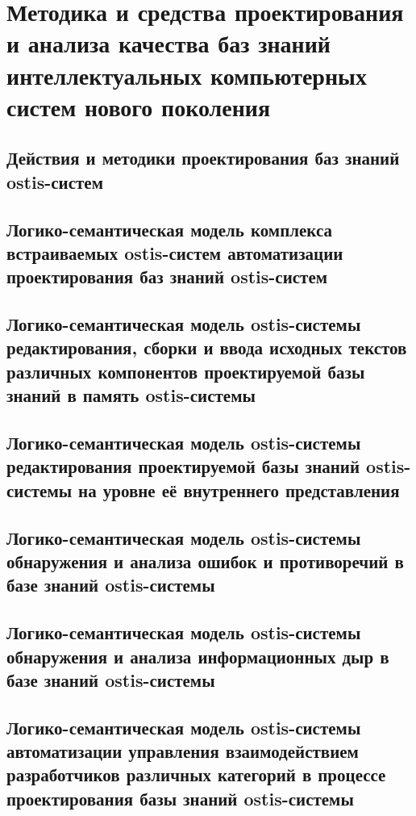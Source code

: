 \chapter{Методика и средства проектирования и анализа качества баз знаний интеллектуальных компьютерных систем нового поколения}
\label{chapter_kb_design}


\section{Действия и методики проектирования баз знаний ostis-систем}
\section{Логико-семантическая модель комплекса встраиваемых ostis-систем автоматизации проектирования баз знаний ostis-систем}
\section{Логико-семантическая модель ostis-системы редактирования, сборки и ввода исходных текстов различных компонентов проектируемой базы знаний в память ostis-системы}
\section{Логико-семантическая модель ostis-системы редактирования проектируемой базы знаний ostis-системы на уровне её внутреннего представления}
\section{Логико-семантическая модель ostis-системы обнаружения и анализа ошибок и противоречий в базе знаний ostis-системы}
\section{Логико-семантическая модель ostis-системы обнаружения и анализа информационных дыр в базе знаний ostis-системы} 
\section{Логико-семантическая модель ostis-системы автоматизации управления взаимодействием разработчиков различных категорий в процессе проектирования базы знаний ostis-системы}

%
